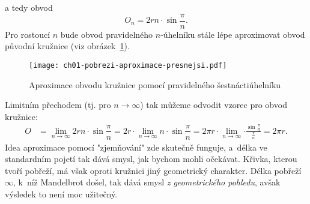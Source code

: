 a tedy obvod
\begin{equation*}
    O_n=2rn\cdot\sin{\dfrac{\pi}{n}}.
\end{equation*}
Pro rostoucí $n$ bude obvod pravidelného $n$-úhelníku stále lépe aproximovat obvod původní kružnice (viz obrázek~\ref{fig:archimedova_metoda_presnejsi}).
\begin{figure}[h]
    \centering
    \texttt{[image: ch01-pobrezi-aproximace-presnejsi.pdf]}
    \caption{Aproximace obvodu kružnice pomocí pravidelného šestnáctiúhelníku}
    \label{fig:archimedova_metoda_presnejsi}
\end{figure}
Limitním přechodem (tj. pro $n\to\infty$) tak můžeme odvodit vzorec pro obvod kružnice:
\begin{align*}
    O&=\lim_{n\to\infty}{2rn\cdot\sin{\dfrac{\pi}{n}}}=2r\cdot\lim_{n\to\infty}{n\cdot\sin{\dfrac{\pi}{n}}}=2\pi r\cdot\lim_{n\to\infty}{\cdot\frac{\sin{\frac{\pi}{n}}}{\frac{\pi}{n}}}=2\pi r.
\end{align*}
Idea aproximace pomocí "zjemňování" zde skutečně funguje, a~délka ve standardním pojetí tak dává smysl, jak bychom mohli očekávat. Křivka, kterou tvoří pobřeží, má však oproti kružnici jiný geometrický charakter. Délka pobřeží $\infty$, k~níž Mandelbrot došel, tak dává smysl \emph{z geometrického pohledu}, avšak výsledek to není moc užitečný.